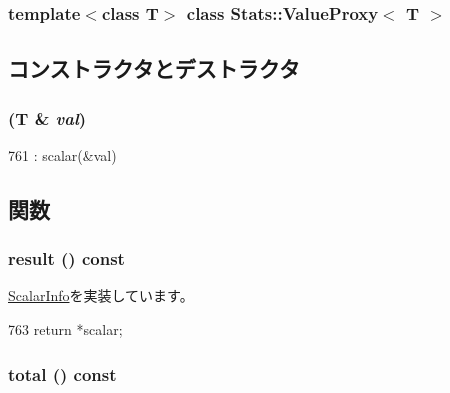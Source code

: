 \subsubsection*{template$<$class T$>$ class Stats::ValueProxy$<$ T $>$}



\subsection{コンストラクタとデストラクタ}
\hypertarget{classStats_1_1ValueProxy_a9760e2c14afd730dd4a2ac1287431afb}{
\subsubsection[{ValueProxy}]{ (T \& {\em val})}}
\label{classStats_1_1ValueProxy_a9760e2c14afd730dd4a2ac1287431afb}



\begin{DoxyCode}
761 : scalar(&val) {}
\end{DoxyCode}


\subsection{関数}
\hypertarget{classStats_1_1ValueProxy_ae050da86c3d8e8a677a0bdeb7971e1e3}{
\subsubsection[{result}]{ result () const}}
\label{classStats_1_1ValueProxy_ae050da86c3d8e8a677a0bdeb7971e1e3}


\hyperlink{classStats_1_1ScalarInfo_a8c2a750792392eea5225b05b9ec4bead}{ScalarInfo}を実装しています。


\begin{DoxyCode}
763 { return *scalar; }
\end{DoxyCode}
\hypertarget{classStats_1_1ValueProxy_a35c6e2ed3fc81b40d69052a062113ead}{
\subsubsection[{total}]{ total () const}}
\label{classStats_1_1ValueProxy_a35c6e2ed3fc81b40d69052a062113ead}


